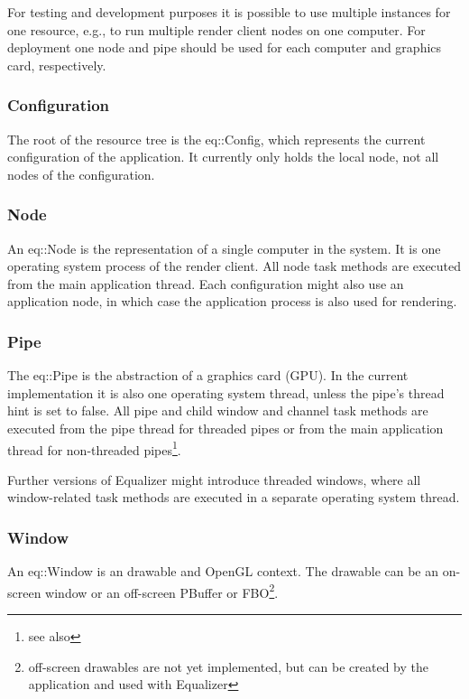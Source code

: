 \documentclass[10pt,a4]{scrartcl}
\begin{document}
For testing and development purposes it is possible to use multiple
instances for one resource, e.g., to run multiple render client nodes on
one computer. For deployment one node and pipe should be used for each
computer and graphics card, respectively.

\subsubsection{Configuration}

The root of the resource tree is the \textsf{eq::Config}, which
represents the current configuration of the application. It currently
only holds the local node, not all nodes of the configuration.

\subsubsection{Node}

An \textsf{eq::Node} is the representation of a single computer in the
system. It is one operating system process of the render client. All
node task methods are executed from the main application thread. Each
configuration might also use an application node, in which case the
application process is also used for rendering.

\subsubsection{Pipe}

The \textsf{eq::Pipe} is the abstraction of a graphics card (GPU). In
the current implementation it is also one operating system thread,
unless the pipe's thread hint is set to \textsf{false}. All pipe and
child window and channel task methods are executed from the pipe thread
for threaded pipes or from the main application thread for non-threaded
pipes\footnote{see also
  }.

Further versions of Equalizer might introduce threaded windows, where
all window-related task methods are executed in a separate operating
system thread.

\subsubsection{Window}

An \textsf{eq::Window} is an drawable and OpenGL context. The drawable
can be an on-screen window or an off-screen PBuffer or
FBO\footnote{off-screen drawables are not yet implemented, but can be
  created by the application and used with Equalizer}. 
\end{document}
